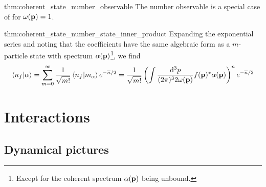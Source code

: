 \begin{delayedproof}{thm:coherent_state_number_observable}
	The number observable is a special case of  for $\omega(\vb{p})=1$.
\end{delayedproof}
\begin{delayedproof}{thm:coherent_state_number_state_inner_product}
	Expanding the exponential series and noting that the coefficients have the same algebraic form as a $m$-particle state with spectrum $\alpha(\vb{p})$\footnote{Except for the coherent spectrum $\alpha(\vb{p})$ being unbound.}, we find
	\begin{equation*}
		\braket{n_f}{\alpha}
		=
		\sum_{m=0}^\infty
		\frac{1}{\sqrt{m!}}
		\braket{n_f}{m_\alpha}
		e^{-\overline{n}/2}
		=
		\frac{1}{\sqrt{m!}}
		\left(
			\int\frac{\dd[3]{p}}{(2\pi)^32\omega(\vb{p})}
			f(\vb{p})^*
			\alpha(\vb{p})
		\right)^n
		e^{-\overline{n}/2}
	\end{equation*}
\end{delayedproof}

\section{Interactions}

\subsection{Dynamical pictures}

